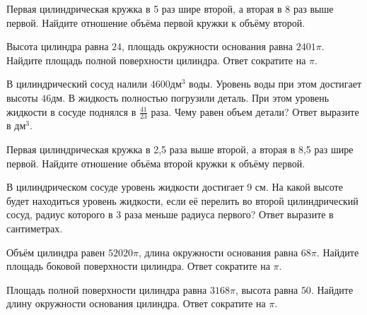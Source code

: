\documentclass[4apaper]{article}
\begin{document}
\begin{taskBN}{29}
 Первая цилиндрическая кружка в 5 раз шире второй, а вторая в 8 раз выше первой. Найдите отношение объёма первой кружки к объёму второй.
\end{taskBN}

\begin{taskBN}{30}
Высота цилиндра равна $24$, площадь окружности основания равна $2401\pi$. Найдите площадь полной поверхности цилиндра. Ответ сократите на $\pi$.
\end{taskBN}

\begin{taskBN}{31}
В цилиндрический сосуд налили $4600\mbox{дм}^3$ воды. Уровень воды при этом достигает высоты $46$дм. В жидкость полностью погрузили деталь. При этом уровень жидкости в сосуде поднялся в $\frac{41}{23}$ раза. Чему равен объем детали? Ответ выразите в $\mbox{дм}^3$.
\end{taskBN}

\begin{taskBN}{32}
 Первая цилиндрическая кружка в 2,5 раза выше второй, а вторая в 8,5 раз шире первой. Найдите отношение объёма второй кружки к объёму первой.
\end{taskBN}

\begin{taskBN}{33}
В цилиндрическом сосуде уровень жидкости достигает 9 см. На какой высоте будет находиться уровень жидкости, если её перелить во второй цилиндрический сосуд, радиус которого в 3 раза меньше радиуса первого? Ответ выразите в сантиметрах.
\end{taskBN}

\begin{taskBN}{34}
Объём цилиндра равен $52020\pi$, длина окружности основания равна $68\pi$. Найдите площадь боковой поверхности цилиндра. Ответ сократите на $\pi$.
\end{taskBN}

\begin{taskBN}{35}
Площадь полной поверхности цилиндра равна $3168\pi$, высота равна $50$. Найдите длину окружности основания цилиндра. Ответ сократите на $\pi$.
\end{taskBN}
\end{document}
